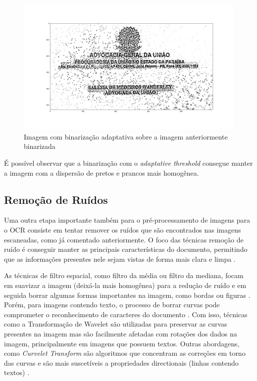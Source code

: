 \begin{figure}[h]
  \centering
  \caption{Imagem com binarização adaptativa sobre a imagem anteriormente binarizada}
  \includegraphics[scale=0.25]{figuras/binarization-adaptative-threshold.jpg}
\end{figure}

É possível observar que a binarização com o \textit{adaptative threshold} consegue manter a imagem com a dispersão de pretos e prancos mais homogênea.


\subsection{Remoção de Ruídos}


Uma outra etapa importante também para o pré-processamento de imagens para o OCR consiste em tentar remover os ruídos que são encontrados nas imagens escaneadas, como já comentado anteriormente. O foco das técnicas remoção de ruído é conseguir manter as principais características do documento, permitindo que as informações presentes nele sejam vistas de forma mais clara e limpa \cite{image-denoising-techniques}.

As técnicas de filtro espacial, como filtro da média ou filtro da mediana, focam em suavizar a imagem (deixá-la mais homogênea) para a redução de ruído e em seguida borrar algumas formas importantes na imagem, como bordas ou figuras \cite{document-image-denoising}. Porém, para imagens contendo texto, o processo de borrar curvas pode comprometer o reconhecimento de caracteres do documento \cite{image-denoising-techniques}. Com isso, técnicas como a Transformação de Wavelet são utilizadas para preservar as curvas presentes na imagem \cite{image-denoising-techniques} mas são facilmente afetadas com rotações dos dados na imagem, principalmente em imagens que possuem textos. Outras abordagens, como \textit{Curvelet Transform} \cite{fast-discrete-curvelet-transforms} são algoritmos que concentram as correções em torno das curvas e são mais suscetíveis a propriedades directionais (linhas contendo textos) \cite{image-denoising-techniques}.

